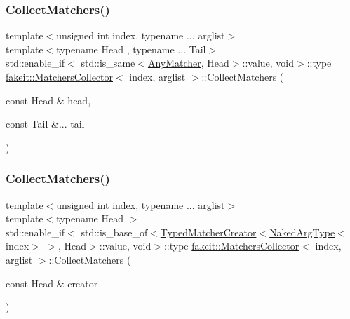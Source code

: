 \mbox{\label{classfakeit_1_1MatchersCollector_a5bc97a3d729b1bb67e372181ad88b77d}} 
\subsubsection{\texorpdfstring{CollectMatchers()}{CollectMatchers()}\hspace{0.1cm}{\footnotesize\ttfamily [40/63]}}
{\footnotesize\ttfamily template$<$unsigned int index, typename ... arglist$>$ \\
template$<$typename Head , typename ... Tail$>$ \\
std\+::enable\+\_\+if$<$ std\+::is\+\_\+same$<$\mbox{\hyperlink{structfakeit_1_1AnyMatcher}{Any\+Matcher}}, Head$>$\+::value, void$>$\+::type \mbox{\hyperlink{classfakeit_1_1MatchersCollector}{fakeit\+::\+Matchers\+Collector}}$<$ index, arglist $>$\+::Collect\+Matchers (\begin{DoxyParamCaption}\item[{const Head \&}]{head,  }\item[{const Tail \&...}]{tail }\end{DoxyParamCaption})\hspace{0.3cm}{\ttfamily [inline]}}

\mbox{\label{classfakeit_1_1MatchersCollector_ae954aa74286bcd096169067f5e897356}} 
\subsubsection{\texorpdfstring{CollectMatchers()}{CollectMatchers()}\hspace{0.1cm}{\footnotesize\ttfamily [41/63]}}
{\footnotesize\ttfamily template$<$unsigned int index, typename ... arglist$>$ \\
template$<$typename Head $>$ \\
std\+::enable\+\_\+if$<$ std\+::is\+\_\+base\+\_\+of$<$\mbox{\hyperlink{structfakeit_1_1TypedMatcherCreator}{Typed\+Matcher\+Creator}}$<$\mbox{\hyperlink{classfakeit_1_1MatchersCollector_aeda8ced6a2f0cb7c6e4f916f18a91730}{Naked\+Arg\+Type}}$<$index$>$ $>$, Head$>$\+::value, void$>$\+::type \mbox{\hyperlink{classfakeit_1_1MatchersCollector}{fakeit\+::\+Matchers\+Collector}}$<$ index, arglist $>$\+::Collect\+Matchers (\begin{DoxyParamCaption}\item[{const Head \&}]{creator }\end{DoxyParamCaption})\hspace{0.3cm}{\ttfamily [inline]}}

